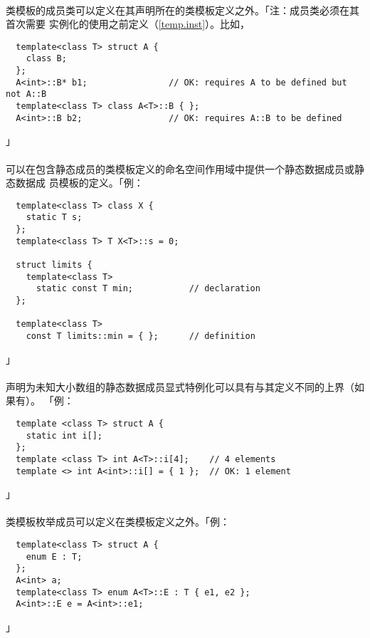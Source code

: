 \paragraph{}
类模板的成员类可以定义在其声明所在的类模板定义之外。「注：成员类必须在其首次需要
实例化的使用之前定义（\ref{temp.inst}）。比如，
\begin{lstlisting}
  template<class T> struct A {
    class B;
  };
  A<int>::B* b1;                // OK: requires A to be defined but not A::B
  template<class T> class A<T>::B { };
  A<int>::B b2;                 // OK: requires A::B to be defined
\end{lstlisting}」

\paragraph{}
可以在包含静态成员的类模板定义的命名空间作用域中提供一个静态数据成员或静态数据成
员模板的定义。「例：
\begin{lstlisting}
  template<class T> class X {
    static T s;
  };
  template<class T> T X<T>::s = 0;

  struct limits {
    template<class T>
      static const T min;           // declaration
  };

  template<class T>
    const T limits::min = { };      // definition
\end{lstlisting}」

\paragraph{}
声明为未知大小数组的静态数据成员显式特例化可以具有与其定义不同的上界（如果有）。
「例：
\begin{lstlisting}
  template <class T> struct A {
    static int i[];
  };
  template <class T> int A<T>::i[4];    // 4 elements
  template <> int A<int>::i[] = { 1 };  // OK: 1 element
\end{lstlisting}」

\paragraph{}
类模板枚举成员可以定义在类模板定义之外。「例：
\begin{lstlisting}
  template<class T> struct A {
    enum E : T;
  };
  A<int> a;
  template<class T> enum A<T>::E : T { e1, e2 };
  A<int>::E e = A<int>::e1;
\end{lstlisting}」

